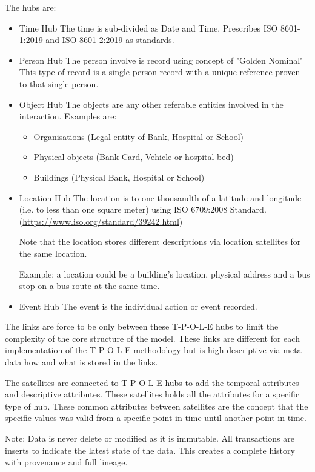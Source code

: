 The hubs are:
\begin{itemize}
    \item Time Hub
    The time is sub-divided as Date and Time.
    Prescribes ISO 8601-1:2019 and ISO 8601-2:2019 as standards.
    
    \item Person Hub
    The person involve is record using concept of "Golden Nominal"
    This type of record is a single person record with a unique reference proven to that single person.
    
    \item Object Hub
    The objects are any other referable entities involved in the interaction.
    Examples are:
    \begin{itemize}
        \item Organisations (Legal entity of Bank, Hospital or School)
        \item Physical objects (Bank Card, Vehicle or hospital bed)
        \item Buildings (Physical Bank, Hospital or School)
    \end{itemize}
    \item Location Hub
    The location is to one thousandth of a latitude and longitude (i.e. to less than one square meter) using ISO 6709:2008 Standard. (\url{https://www.iso.org/standard/39242.html})
    
    Note that the location stores different descriptions via location satellites for the same location.
    
    Example: a location could be a building's location, physical address and a bus stop on a bus route at the same time.
    
    \item Event Hub
    The event is the individual action or event recorded.
    
\end{itemize}

The links are force to be only between these T-P-O-L-E hubs to limit the complexity of the core structure of the model. These links are different for each implementation of the T-P-O-L-E methodology but is high descriptive via meta-data how and what is stored in the links.

The satellites are connected to T-P-O-L-E hubs to add the temporal attributes and descriptive attributes.
These satellites holds all the attributes for a specific type of hub.
These common attributes between satellites are the concept that the specific values was valid from a specific point in time until another point in time.

Note: Data is never delete or modified as it is immutable. All transactions are inserts to indicate the latest state of the data. This creates a complete history with provenance and full lineage.

